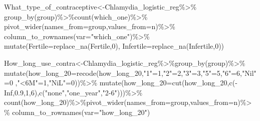 \documentclass[
]{article}
\newenvironment{Shaded}{\begin{snugshade}}{\end{snugshade}}
\newcommand{\AttributeTok}[1]{\textcolor[rgb]{0.77,0.63,0.00}{#1}}
\newcommand{\ConstantTok}[1]{\textcolor[rgb]{0.00,0.00,0.00}{#1}}
\newcommand{\DecValTok}[1]{\textcolor[rgb]{0.00,0.00,0.81}{#1}}
\newcommand{\FloatTok}[1]{\textcolor[rgb]{0.00,0.00,0.81}{#1}}
\newcommand{\FunctionTok}[1]{\textcolor[rgb]{0.00,0.00,0.00}{#1}}
\newcommand{\NormalTok}[1]{#1}
\newcommand{\OtherTok}[1]{\textcolor[rgb]{0.56,0.35,0.01}{#1}}
\newcommand{\SpecialCharTok}[1]{\textcolor[rgb]{0.00,0.00,0.00}{#1}}
\newcommand{\StringTok}[1]{\textcolor[rgb]{0.31,0.60,0.02}{#1}}
\begin{document}
\begin{Shaded}
\begin{Highlighting}[]
\NormalTok{What\_type\_of\_contraceptive}\OtherTok{\textless{}{-}}\NormalTok{Chlamydia\_logistic\_reg}\SpecialCharTok{\%\textgreater{}\%}
  \FunctionTok{group\_by}\NormalTok{(group)}\SpecialCharTok{\%\textgreater{}\%}\FunctionTok{count}\NormalTok{(which\_one)}\SpecialCharTok{\%\textgreater{}\%}
  \FunctionTok{pivot\_wider}\NormalTok{(}\AttributeTok{names\_from=}\NormalTok{group,}\AttributeTok{values\_from=}\NormalTok{n)}\SpecialCharTok{\%\textgreater{}\%}
  \FunctionTok{column\_to\_rownames}\NormalTok{(}\AttributeTok{var=}\StringTok{"which\_one"}\NormalTok{)}\SpecialCharTok{\%\textgreater{}\%}
  \FunctionTok{mutate}\NormalTok{(}\AttributeTok{Fertile=}\FunctionTok{replace\_na}\NormalTok{(Fertile,}\DecValTok{0}\NormalTok{),}
         \AttributeTok{Infertile=}\FunctionTok{replace\_na}\NormalTok{(Infertile,}\DecValTok{0}\NormalTok{))}

\NormalTok{How\_long\_use\_contra}\OtherTok{\textless{}{-}}\NormalTok{Chlamydia\_logistic\_reg}\SpecialCharTok{\%\textgreater{}\%}\FunctionTok{group\_by}\NormalTok{(group)}\SpecialCharTok{\%\textgreater{}\%}
  \FunctionTok{mutate}\NormalTok{(}\AttributeTok{how\_long\_20=}\FunctionTok{recode}\NormalTok{(how\_long\_20,}\StringTok{"1"}\OtherTok{=}\DecValTok{1}\NormalTok{,}\StringTok{"2"}\OtherTok{=}\DecValTok{2}\NormalTok{,}\StringTok{"3"}\OtherTok{=}\DecValTok{3}\NormalTok{,}\StringTok{"5"}\OtherTok{=}\DecValTok{5}\NormalTok{,}\StringTok{"6"}\OtherTok{=}\DecValTok{6}\NormalTok{,}\StringTok{"Nil"}\OtherTok{=}\DecValTok{0}\NormalTok{ ,}\StringTok{"\textless{}6M"}\OtherTok{=}\DecValTok{1}\NormalTok{,}\StringTok{"NiL"}\OtherTok{=}\DecValTok{0}\NormalTok{))}\SpecialCharTok{\%\textgreater{}\%}
  \FunctionTok{mutate}\NormalTok{(}\AttributeTok{how\_long\_20=}\FunctionTok{cut}\NormalTok{(how\_long\_20,}\FunctionTok{c}\NormalTok{(}\SpecialCharTok{{-}}\ConstantTok{Inf}\NormalTok{,}\FloatTok{0.9}\NormalTok{,}\DecValTok{1}\NormalTok{,}\DecValTok{6}\NormalTok{),}\FunctionTok{c}\NormalTok{(}\StringTok{"none"}\NormalTok{,}\StringTok{"one\_year"}\NormalTok{,}\StringTok{"2{-}6"}\NormalTok{)))}\SpecialCharTok{\%\textgreater{}\%}
 \FunctionTok{count}\NormalTok{(how\_long\_20)}\SpecialCharTok{\%\textgreater{}\%}\FunctionTok{pivot\_wider}\NormalTok{(}\AttributeTok{names\_from=}\NormalTok{group,}\AttributeTok{values\_from=}\NormalTok{n)}\SpecialCharTok{\%\textgreater{}\%}
  \FunctionTok{column\_to\_rownames}\NormalTok{(}\AttributeTok{var=}\StringTok{"how\_long\_20"}\NormalTok{)}


\end{Highlighting}
\end{Shaded}
\end{document}
